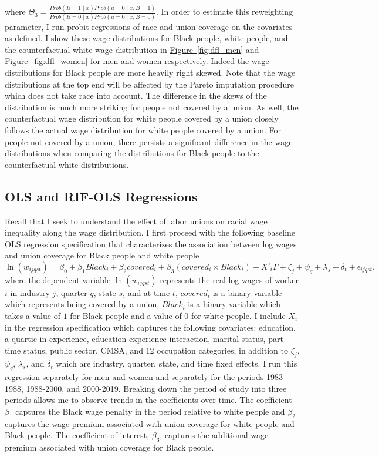 \documentclass[11pt]{article}
\begin{document}
where $\Theta_3 = \frac{Prob(B = 1\mid x) Prob(u = 0\mid x, B = 1)}{Prob(B = 0\mid x)Prob(u = 0\mid x, B = 0)}$. In order to estimate this reweighting parameter, I run probit regressions of race and union coverage on the covariates as defined. I show these wage distributions for Black people, white people, and the counterfactual white wage distribution in \hyperref[fig:dfl_men]{Figure~\ref*{fig:dfl_men}} and \hyperref[fig:dfl_women]{Figure~\ref*{fig:dfl_women}} for men and women respectively. Indeed the wage distributions for Black people are more heavily right skewed. Note that the wage distributions at the top end will be affected by the Pareto imputation procedure which does not take race into account. The difference in the skews of the distribution is much more striking for people not covered by a union. As well, the counterfactual wage distribution for white people covered by a union closely follows the actual wage distribution for white people covered by a union. For people not covered by a union, there persists a significant difference in the wage distributions when comparing the distributions for Black people to the counterfactual white distributions.   

\subsection{OLS and RIF-OLS Regressions}
Recall that I seek to understand the effect of labor unions on racial wage inequality along the wage distribution. I first proceed with the following baseline OLS regression specification that characterizes the association between log wages and union coverage for Black people and white people
\begin{equation}
    \ln(w_{ijqst}) = \beta_0 + \beta_1 Black_i + \beta_2 covered_i + \beta_3 (covered_i \times Black_i)+ X'_i\Gamma + \zeta_j + \psi_q + \lambda_s  + \delta_t + \epsilon_{ijqst},
\end{equation}
where the dependent variable $\ln(w_{ijqst})$ represents the real log wages of worker $i$ in industry $j$, quarter $q$, state $s$, and at time $t$, $covered_i$ is a binary variable which represents being covered by a union, $Black_i$ is a binary variable which takes a value of $1$ for Black people and a value of $0$ for white people. I include $X_i$ in the regression specification which captures the following covariates: education, a quartic in experience, education-experience interaction, marital status, part-time status, public sector, CMSA, and 12 occupation categories, in addition to $\zeta_j$, $\psi_q$, $\lambda_s$, and $\delta_t$ which are industry, quarter, state, and time fixed effects. I run this regression separately for men and women and separately for the periods 1983-1988, 1988-2000, and 2000-2019. Breaking down the period of study into three periods allows me to observe trends in the coefficients over time. The coefficient $\beta_1$ captures the Black wage penalty in the period relative to white people and $\beta_2$ captures the wage premium associated with union coverage for white people and Black people. The coefficient of interest, $\beta_3$, captures the additional wage premium associated with union coverage for Black people. 
\end{document}
